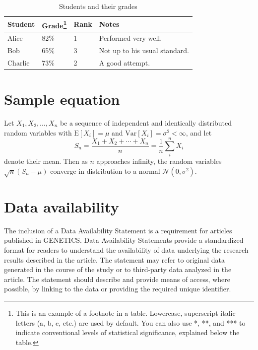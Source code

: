 \documentclass[9pt,twocolumn,twoside,lineno]{gsajnl}
\begin{document}
\begin{table}[p]
\centering
\caption{Students and their grades}
\begin{tableminipage}{\textwidth}
\begin{tabularx}{\textwidth}{@{}XXXX@{}}
\hline
{\bf Student} & {\bf Grade}\footnote{This is an example of a footnote in a table. Lowercase, superscript italic letters (a, b, c, etc.) are used by default. You can also use *, **, and *** to indicate conventional levels of statistical significance, explained below the table.} & {\bf Rank} & {\bf Notes} \\
\hline
Alice & 82\% & 1 & Performed very well.\\
Bob & 65\% & 3 & Not up to his usual standard.\\
Charlie & 73\% & 2 & A good attempt.\\
\hline
\end{tabularx}
  \label{tab:shape-functions}
\end{tableminipage}
\end{table}

\section{Sample equation}

Let $X_1, X_2, \ldots, X_n$ be a sequence of independent and identically distributed random variables with $\text{E}[X_i] = \mu$ and $\text{Var}[X_i] = \sigma^2 < \infty$, and let
\begin{equation}
S_n = \frac{X_1 + X_2 + \cdots + X_n}{n}
      = \frac{1}{n}\sum_{i}^{n} X_i
\label{eq:refname1}
\end{equation}
denote their mean. Then as $n$ approaches infinity, the random variables $\sqrt{n}(S_n - \mu)$ converge in distribution to a normal $\mathcal{N}(0, \sigma^2)$.

\section{Data availability}

The inclusion of a Data Availability Statement is a requirement for articles published in GENETICS. Data Availability Statements provide a standardized format for readers to understand the availability of data underlying the research results described in the article. The statement may refer to original data generated in the course of the study or to third-party data analyzed in the article. The statement should describe and provide means of access, where possible, by linking to the data or providing the required unique identifier.
\end{document}
